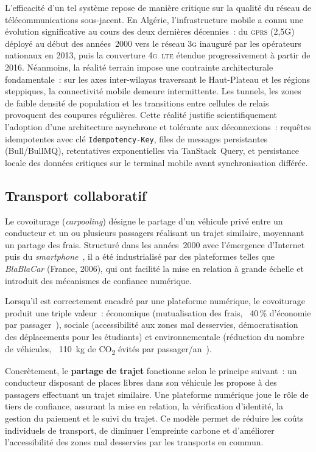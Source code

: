 L'efficacité d'un tel système repose de manière critique sur la qualité du réseau de télécommunications sous-jacent. En Algérie, l'infrastructure mobile a connu une évolution significative au cours des deux dernières décennies~: du \textsc{gprs} (2,5G) déployé au début des années~2000 vers le réseau \textsc{3g} inauguré par les opérateurs nationaux en 2013, puis la couverture \textsc{4g~lte} étendue progressivement à partir de 2016. Néanmoins, la réalité terrain impose une contrainte architecturale fondamentale~: sur les axes inter-wilayas traversant le Haut-Plateau et les régions steppiques, la connectivité mobile demeure intermittente. Les tunnels, les zones de faible densité de population et les transitions entre cellules de relais provoquent des coupures régulières. Cette réalité justifie scientifiquement l'adoption d'une architecture asynchrone et tolérante aux déconnexions~: requêtes idempotentes avec clé \texttt{Idempotency-Key}, files de messages persistantes (Bull/BullMQ), retentatives exponentielles via TanStack~Query, et persistance locale des données critiques sur le terminal mobile avant synchronisation différée.

\subsection{Transport collaboratif}
\label{sec:definition-covoiturage}

Le covoiturage (\textit{carpooling}) désigne le partage d'un véhicule privé entre un conducteur et un ou plusieurs passagers réalisant un trajet similaire, moyennant un partage des frais. Structuré dans les années~2000 avec l'émergence d'Internet puis du \textit{smartphone}~\cite{chan_carpooling_2012}, il a été industrialisé par des plateformes telles que \textit{BlaBlaCar} (France, 2006), qui ont facilité la mise en relation à grande échelle et introduit des mécanismes de confiance numérique.

Lorsqu'il est correctement encadré par une plateforme numérique, le covoiturage produit une triple valeur~: économique (mutualisation des frais, ~40\,\% d'économie par passager~\cite{blablacar_report_2023}), sociale (accessibilité aux zones mal desservies, démocratisation des déplacements pour les étudiants) et environnementale (réduction du nombre de véhicules, ~110~kg de CO\textsubscript{2} évités par passager/an~\cite{ademe_2022}).

Concrètement, le \textbf{partage de trajet} fonctionne selon le principe suivant~: un conducteur disposant de places libres dans son véhicule les propose à des passagers effectuant un trajet similaire. Une plateforme numérique joue le rôle de tiers de confiance, assurant la mise en relation, la vérification d'identité, la gestion du paiement et le suivi du trajet. Ce modèle permet de réduire les coûts individuels de transport, de diminuer l'empreinte carbone et d'améliorer l'accessibilité des zones mal desservies par les transports en commun.

